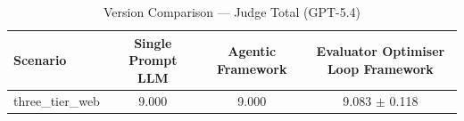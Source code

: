 \begin{table}[htbp]
\centering
\caption{Version Comparison — Judge Total (GPT-5.4)}
\label{tab:version_judge_total}
\begin{tabular}{lccc}
\toprule
Scenario & Single Prompt LLM & Agentic Framework & Evaluator Optimiser Loop Framework \\
\midrule
three\_tier\_web & 9.000 & 9.000 & 9.083 $\pm$ 0.118 \\
\bottomrule
\end{tabular}
\end{table}